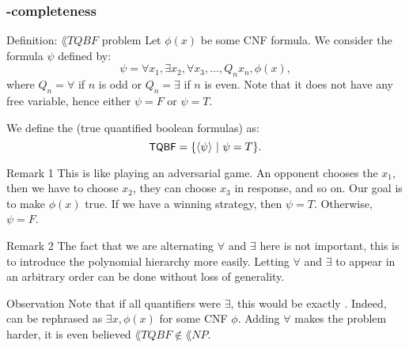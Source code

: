 \documentclass[a4paper]{article}
\begin{document}
\subsubsection{-completeness}

\begin{parag}{Definition: $\lang{TQBF}$ problem}
    Let $\phi\left(x\right)$ be some CNF formula. We consider the formula $\psi$ defined by:
    \[\psi = \forall x_1, \exists x_2, \forall x_3, \ldots, Q_n x_n, \phi\left(x\right),\]
    where $Q_n = \forall$ if $n$ is odd or $Q_n = \exists$ if $n$ is even. Note that it does not have any free variable, hence either $\psi = F$ or $\psi = T$.

    We define the  (true quantified boolean formulas) as: 
    \[\lang{TQBF} = \left\{\left\langle \psi \right\rangle \suchthat \psi = T\right\}.\]
    
    \begin{subparag}{Remark 1}
        This is like playing an adversarial game. An opponent chooses the $x_1$, then we have to choose $x_2$, they can choose $x_3$ in response, and so on. Our goal is to make $\phi\left(x\right)$ true. If we have a winning strategy, then $\psi = T$. Otherwise, $\psi = F$.
    \end{subparag}

    \begin{subparag}{Remark 2}
        The fact that we are alternating $\forall$ and $\exists$ here is not important, this is to introduce the polynomial hierarchy more easily. Letting $\forall$ and $\exists$ to appear in an arbitrary order can be done without loss of generality.
    \end{subparag}

    \begin{subparag}{Observation}
        Note that if all quantifiers were $\exists$, this would be exactly . Indeed,  can be rephrased as $\exists x, \phi\left(x\right)$ for some CNF $\phi$. Adding $\forall$ makes the problem harder, it is even believed $\lang{TQBF} \not\in \lang{NP}$.
    \end{subparag}
\end{parag}
\end{document}
